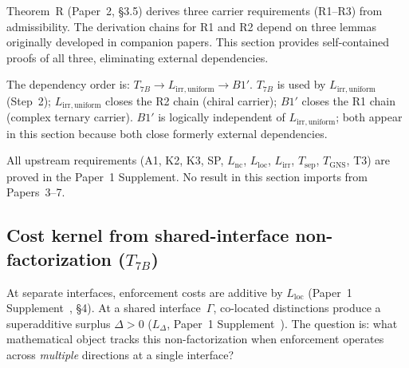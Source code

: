 \documentclass[11pt,a4paper]{article}
\theoremstyle{definition}
\begin{document}
Theorem~R (Paper~2, \S3.5) derives three carrier requirements (R1--R3)
from admissibility.  The derivation chains for R1 and R2 depend on three
lemmas originally developed in companion papers.  This section provides
self-contained proofs of all three, eliminating external dependencies.

The dependency order is: $T_{7B} \to L_{\mathrm{irr,uniform}} \to B1'$.
$T_{7B}$ is used by $L_{\mathrm{irr,uniform}}$ (Step~2);
$L_{\mathrm{irr,uniform}}$ closes the R2 chain (chiral carrier);
$B1'$ closes the R1 chain (complex ternary carrier).
$B1'$ is logically independent of $L_{\mathrm{irr,uniform}}$;
both appear in this section because both close formerly external
dependencies.

All upstream requirements (A1, K2, K3, SP, $L_{\mathrm{nc}}$,
$L_{\mathrm{loc}}$, $L_{\mathrm{irr}}$, $T_{\mathrm{sep}}$,
$T_{\mathrm{GNS}}$, T3) are proved in the Paper~1 Supplement.
No result in this section imports from Papers~3--7.

%
%
%


\subsection{Cost kernel from shared-interface non-factorization ($T_{7B}$)}
\label{sec:T7B}

At separate interfaces, enforcement costs are additive by $L_{\mathrm{loc}}$
(Paper~1 Supplement~\cite{BrookeSupplement}, \S4).  At a shared interface~$\Gamma$, co-located
distinctions produce a superadditive surplus $\Delta > 0$ ($L_\Delta$, Paper~1 Supplement~\cite{BrookeSupplement}).  The question is: what mathematical object
tracks this non-factorization when enforcement operates across
\emph{multiple} directions at a single interface?
\end{document}
